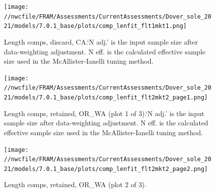\documentclass[11pt,
  english,
  a4paper,
]{article}
\begin{document}
\tagmcend\tagstructend


\begin{figure}
\centering
\texttt{[image: //nwcfile/FRAM/Assessments/CurrentAssessments/Dover\_sole\_2021/models/7.0.1\_base/plots/comp\_lenfit\_flt1mkt1.png]}
\caption{Length comps, discard, CA.`N adj.' is the input sample size after data-weighting adjustment. N eff. is the calculated effective sample size used in the McAllister-Ianelli tuning method.\label{fig:comp_lenfit_flt1mkt1}}
\end{figure}

\tagmcend\tagstructend


\begin{figure}
\centering
\texttt{[image: //nwcfile/FRAM/Assessments/CurrentAssessments/Dover\_sole\_2021/models/7.0.1\_base/plots/comp\_lenfit\_flt2mkt2\_page1.png]}
\caption{Length comps, retained, OR\_WA (plot 1 of 3).`N adj.' is the input sample size after data-weighting adjustment. N eff. is the calculated effective sample size used in the McAllister-Ianelli tuning method.\label{fig:comp_lenfit_flt2mkt2_page1}}
\end{figure}

\tagmcend\tagstructend


\begin{figure}
\centering
\texttt{[image: //nwcfile/FRAM/Assessments/CurrentAssessments/Dover\_sole\_2021/models/7.0.1\_base/plots/comp\_lenfit\_flt2mkt2\_page2.png]}
\caption{Length comps, retained, OR\_WA (plot 2 of 3).\label{fig:comp_lenfit_flt2mkt2_page2}}
\end{figure}

\tagmcend\tagstructend

\end{document}
